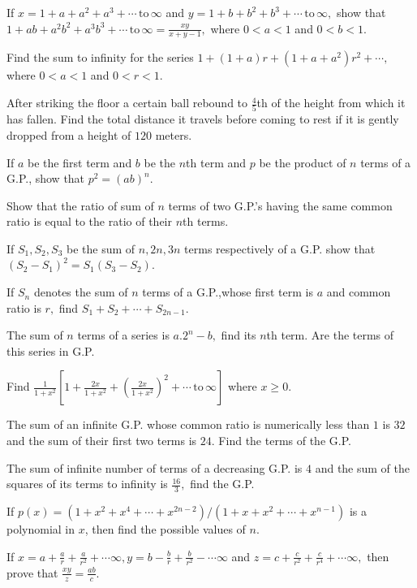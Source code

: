 \item If $x = 1 + a + a^2 + a^3 + \cdots\,\text{to}\,\infty$ and $y = 1 + b + b^2 + b^3 + \cdots\,\text{to}\,\infty,$ show
  that $1 + ab + a^2b^2 + a^3b^3 + \cdots\,\text{to}\,\infty = \frac{xy}{x + y - 1},$ where $0<a< 1$ and $0<b<1$.
\item Find the sum to infinity for the series $1 + (1 + a)r + (1 + a + a^2)r^2 + \cdots,$ where $0<a<1$ and $0<r<1$.
\item After striking the floor a certain ball rebound to $\frac{4}{5}$th of the height from which it has fallen. Find the total
  distance it travels before coming to rest if it is gently dropped from a height of $120$ meters.
\item If $a$ be the first term and $b$ be the $n$th term and $p$ be the product of $n$ terms of a G.P., show that $p^2 = (ab)^n$.
\item Show that the ratio of sum of $n$ terms of two G.P.'s having the same common ratio is equal to the ratio of their $n$th
  terms.
\item If $S_1, S_2, S_3$ be the sum of $n, 2n, 3n$ terms respectively of a G.P. show that $(S_2 - S_1)^2 = S_1(S_3 - S_2)$.
\item If $S_n$ denotes the sum of $n$ terms of a G.P.,whose first term is $a$ and common ratio is $r,$ find $S_1 + S_2 +  \cdots +
  S_{2n - 1}$.
\item The sum of $n$ terms of a series is $a.2^n - b,$ find its $n$th term. Are the terms of this series in G.P.
\item Find $\frac{1}{1 + x^2}\left[1 + \frac{2x}{1 + x^2} + \left(\frac{2x}{1 + x^2}\right)^2 + \cdots\,\text{to}\,\infty\right]$
  where $x\geq 0$.
\item The sum of an infinite G.P. whose common ratio is numerically less than $1$ is $32$ and the sum of their first two
  terms is $24.$ Find the terms of the G.P.
\item The sum of infinite number of terms of a decreasing G.P. is $4$ and the sum of the squares of its terms to infinity
  is $\frac{16}{3},$ find the G.P.
\item If $p(x) = (1 + x^2 + x^4 + \cdots + x^{2n - 2})/(1 + x + x^2 + \cdots + x^{n - 1})$ is a polynomial in $x$, then
  find the possible values of $n$.
\item If $x = a + \frac{a}{r} + \frac{a}{r^2} + \cdots \infty, y = b - \frac{b}{r} + \frac{b}{r^2} - \cdots \infty$ and $z
  = c + \frac{c}{r^2} + \frac{c}{r^4} + \cdots \infty,$ then prove that $\frac{xy}{z} = \frac{ab}{c}$.
